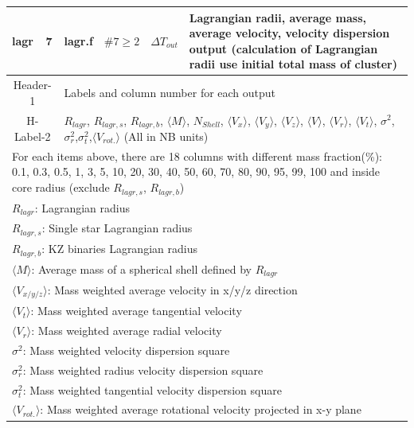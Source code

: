 \begin{longtable}{||p{0.42in}|p{0.25in}|p{0.6in}|p{0.6in}|p{0.4in}|p{2.3in}||}
    lagr   & 7   & lagr.f     & $\#7\geq2$   & $\Delta T_{out}$      & Lagrangian radii, average mass, average velocity, velocity dispersion output (calculation of Lagrangian radii use initial total mass of cluster)  \\\hline
\multicolumn{2}{|c|}{ Header-1 } & \multicolumn{4}{|p{4.4in}|}{ Labels and column number for each output }\\\hline
\multicolumn{2}{|c|}{ H-Label-2} & \multicolumn{4}{|p{4.4in}|}{ $R_{lagr}$, $R_{lagr,s}$, $R_{lagr,b}$, $\langle M\rangle$, $N_{Shell}$, $\langle V_x\rangle$, $\langle V_y\rangle$, $\langle V_z\rangle$, $\langle V\rangle$, $\langle V_r\rangle$, $\langle V_t\rangle$, $\sigma^2$, $\sigma_r^2$,$\sigma_t^2$,$\langle V_{rot.}\rangle$ (All in NB units) }\\\hline
\multicolumn{6}{|p{5.4in}|}{ For each items above, there are 18 columns with different mass fraction(\%): 0.1, 0.3, 0.5, 1, 3, 5, 10, 20, 30, 40, 50, 60, 70, 80, 90, 95, 99, 100 and inside core radius (exclude $R_{lagr,s}$, $R_{lagr,b}$) }\\\hline
\multicolumn{6}{|p{5.4in}|}{ $R_{lagr}$: Lagrangian radius }\\
\multicolumn{6}{|p{5.4in}|}{ $R_{lagr,s}$: Single star Lagrangian radius }\\
\multicolumn{6}{|p{5.4in}|}{ $R_{lagr,b}$: KZ binaries Lagrangian radius }\\
\multicolumn{6}{|p{5.4in}|}{ $\langle M\rangle$: Average mass of a spherical shell defined by $R_{lagr}$}\\
\multicolumn{6}{|p{5.4in}|}{ $\langle V_{x/y/z}\rangle$: Mass weighted average velocity in x/y/z direction}\\
\multicolumn{6}{|p{5.4in}|}{ $\langle V_t\rangle$: Mass weighted average tangential velocity}\\
\multicolumn{6}{|p{5.4in}|}{ $\langle V_r\rangle$: Mass weighted average radial velocity}\\
\multicolumn{6}{|p{5.4in}|}{ $\sigma^2$: Mass weighted velocity dispersion square}\\
\multicolumn{6}{|p{5.4in}|}{ $\sigma_r^2$: Mass weighted radius velocity dispersion square}\\
\multicolumn{6}{|p{5.4in}|}{ $\sigma_t^2$: Mass weighted tangential velocity dispersion square}\\
\multicolumn{6}{|p{5.4in}|}{ $\langle V_{rot.}\rangle$: Mass weighted average rotational velocity projected in x-y plane}\\\hline \hline


\end{longtable}
